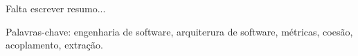 \documentclass[normaltoc,capchap,capsec,times]{abnt}
\begin{document}
\capa
\folhaderosto

\begin{resumo}
 Falta escrever resumo...

 Palavras-chave: engenharia de software, arquiterura de software, métricas, coesão, acoplamento, extração.
\end{resumo}

\sumario



{}

\end{document}
